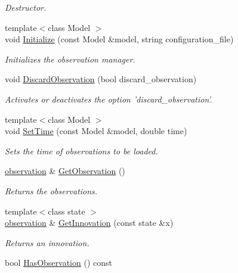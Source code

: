 \documentclass{tufte-book}
\begin{document}
\begin{DoxyCompactItemize}
\begin{DoxyCompactList}\small\item\em \-Destructor. \end{DoxyCompactList}\item
{\footnotesize template$<$class Model $>$ }\\void \hyperlink{class_verdandi_1_1_observation_manager_template_aa3018c692c0ae146e25d87ec6297ff1f}{\-Initialize} (const \-Model \&model, string configuration\-\_\-file)
\begin{DoxyCompactList}\small\item\em \-Initializes the observation manager. \end{DoxyCompactList}\item
void \hyperlink{class_verdandi_1_1_observation_manager_template_af2305e2b0e2b70b6222e2092575e5bbe}{\-Discard\-Observation} (bool discard\-\_\-observation)
\begin{DoxyCompactList}\small\item\em \-Activates or deactivates the option 'discard\-\_\-observation'. \end{DoxyCompactList}\item
{\footnotesize template$<$class Model $>$ }\\void \hyperlink{class_verdandi_1_1_observation_manager_template_a5038bf02f0d6767d6cb726f584db461a}{\-Set\-Time} (const \-Model \&model, double time)
\begin{DoxyCompactList}\small\item\em \-Sets the time of observations to be loaded. \end{DoxyCompactList}\item
\hyperlink{class_verdandi_1_1_observation_manager_template_ae5afff62ea0f6f0926e80467c6d14ec6}{observation} \& \hyperlink{class_verdandi_1_1_observation_manager_template_a029160269b4234c4a73d678b4e9bf9d6}{\-Get\-Observation} ()
\begin{DoxyCompactList}\small\item\em \-Returns the observations. \end{DoxyCompactList}\item
{\footnotesize template$<$class state $>$ }\\\hyperlink{class_verdandi_1_1_observation_manager_template_ae5afff62ea0f6f0926e80467c6d14ec6}{observation} \& \hyperlink{class_verdandi_1_1_observation_manager_template_a81a85208bcd9f1517eb9057c7fc1a185}{\-Get\-Innovation} (const state \&x)
\begin{DoxyCompactList}\small\item\em \-Returns an innovation. \end{DoxyCompactList}\item
\hypertarget{class_verdandi_1_1_observation_manager_template_a10b9ce979397f3fd0208a98c3eec4db0}{
bool \hyperlink{class_verdandi_1_1_observation_manager_template_a10b9ce979397f3fd0208a98c3eec4db0}{\-Has\-Observation} () const }
\label{class_verdandi_1_1_observation_manager_template_a10b9ce979397f3fd0208a98c3eec4db0}


\end{DoxyCompactItemize}
\end{document}
